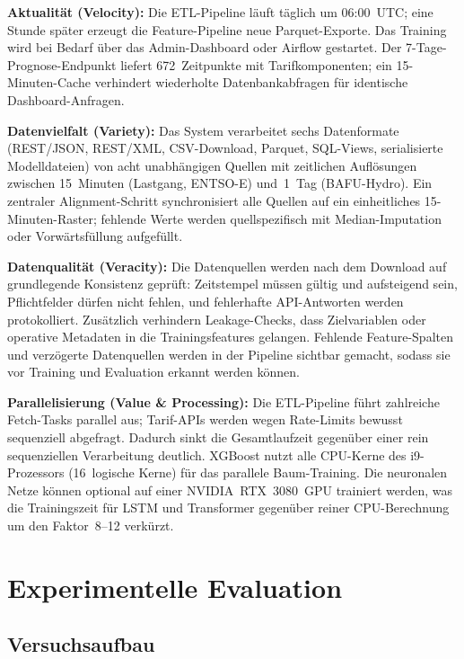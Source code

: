 \documentclass[sigconf]{acmart}
\begin{document}
\textbf{Aktualit\"at (Velocity):}
Die ETL-Pipeline l\"auft t\"aglich um 06:00~UTC; eine Stunde sp\"ater erzeugt
die Feature-Pipeline neue Parquet-Exporte.
Das Training wird bei Bedarf \"uber das Admin-Dashboard oder Airflow gestartet.
Der 7-Tage-Prognose-Endpunkt liefert 672~Zeitpunkte mit Tarifkomponenten;
ein 15-Minuten-Cache verhindert wiederholte Datenbankabfragen f\"ur identische
Dashboard-Anfragen.

\textbf{Datenvielfalt (Variety):}
Das System verarbeitet sechs Daten\-formate (REST/JSON, REST/XML,
CSV-Download, Parquet, SQL-Views, serialisierte Modell\-dateien)
von acht unabh\"angigen Quellen mit zeitlichen Aufl\"osungen
zwischen 15~Minuten (Lastgang, ENTSO-E) und~1~Tag (BAFU-Hydro).
Ein zentraler Alignment-Schritt synchronisiert alle Quellen auf
ein einheitliches 15-Minuten-Raster; fehlende Werte werden quell\-spezifisch
mit Median-Imputation oder Vorw\"artsf\"ullung aufgef\"ullt.

\textbf{Datenqualit\"at (Veracity):}
Die Datenquellen werden nach dem Download auf grundlegende Konsistenz
gepr\"uft: Zeitstempel m\"ussen g\"ultig und aufsteigend sein, Pflichtfelder
d\"urfen nicht fehlen, und fehlerhafte API-Antworten werden protokolliert.
Zus\"atzlich verhindern Leakage-Checks, dass Zielvariablen oder operative
Metadaten in die Trainingsfeatures gelangen.
Fehlende Feature-Spalten und verz\"ogerte Datenquellen werden in der
Pipeline sichtbar gemacht, sodass sie vor Training und Evaluation erkannt
werden k\"onnen.

\textbf{Parallelisierung (Value \& Processing):}
Die ETL-Pipeline f\"uhrt zahlreiche Fetch-Tasks parallel aus;
Tarif-APIs werden wegen Rate-Limits bewusst sequenziell abgefragt.
Dadurch sinkt die Gesamtlaufzeit gegen\"uber einer rein sequenziellen
Verarbeitung deutlich.
XGBoost nutzt alle CPU-Kerne des i9-Prozessors (16~logische Kerne)
f\"ur das parallele Baum-Training.
Die neuronalen Netze k\"onnen optional auf einer NVIDIA~RTX~3080~GPU
trainiert werden, was die Trainingszeit f\"ur LSTM und Transformer
gegen\"uber reiner CPU-Berechnung um den Faktor~8--12 verk\"urzt.

\section{Experimentelle Evaluation}

\subsection{Versuchsaufbau}
\end{document}
